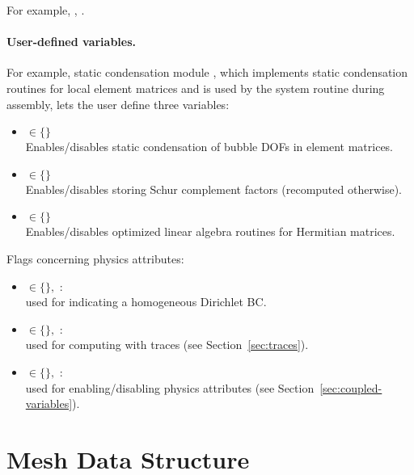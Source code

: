 For example, , .

\paragraph{User-defined variables.}

For example, static condensation module , which implements static condensation routines for local element matrices and is used by the system routine  during assembly, lets the user define three variables:

\begin{itemize}
	\item { $\in \{$$\}$\\
		Enables/disables static condensation of bubble DOFs in element matrices.}
	\item { $\in \{$$\}$\\
		Enables/disables storing Schur complement factors (recomputed otherwise).}
	\item { $\in \{$$\}$\\
		Enables/disables optimized linear algebra routines for Hermitian matrices.}
\end{itemize}

Flags concerning physics attributes:
\begin{itemize}
	\item
	{ $\in \{$$\},$ :\\ 
	used for indicating a homogeneous Dirichlet BC.}
	\item
	{ $\in \{$$\},$ :\\ 
	used for computing with traces (see Section~\ref{sec:traces}).}
	\item 
	{ $\in \{$$\},$ :\\ 
	used for enabling/disabling physics attributes (see Section~\ref{sec:coupled-variables}).}
\end{itemize}

\section{Mesh Data Structure}
\label{sec:data-structure}

